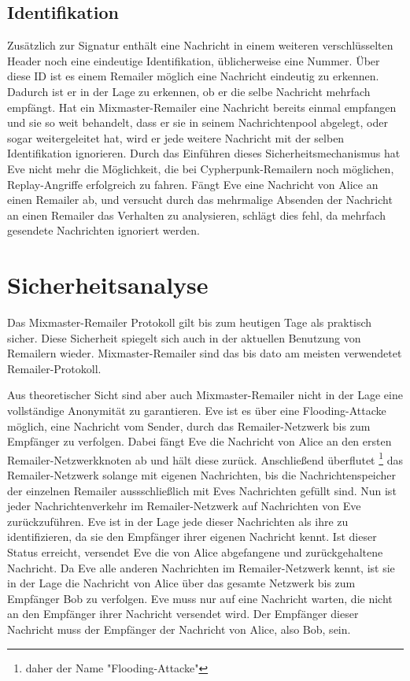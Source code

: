 \subsection{Identifikation}
Zusätzlich zur Signatur enthält eine Nachricht in einem weiteren verschlüsselten Header noch eine eindeutige Identifikation, üblicherweise eine Nummer. Über diese ID ist es einem Remailer möglich eine Nachricht eindeutig zu erkennen. Dadurch ist er in der Lage zu erkennen, ob er die selbe Nachricht mehrfach empfängt. Hat ein Mixmaster-Remailer eine Nachricht bereits einmal empfangen und sie so weit behandelt, dass er sie in seinem Nachrichtenpool abgelegt, oder sogar weitergeleitet hat, wird er jede weitere Nachricht mit der selben Identifikation ignorieren. Durch das Einführen dieses Sicherheitsmechanismus hat Eve nicht mehr die Möglichkeit, die bei Cypherpunk-Remailern noch möglichen, Replay-Angriffe erfolgreich zu fahren. Fängt Eve eine Nachricht von Alice an einen Remailer ab, und versucht durch das mehrmalige Absenden der Nachricht an einen Remailer das Verhalten zu analysieren, schlägt dies fehl, da mehrfach gesendete Nachrichten ignoriert werden.

\section{Sicherheitsanalyse}
Das Mixmaster-Remailer Protokoll gilt bis zum heutigen Tage als praktisch sicher. Diese Sicherheit spiegelt sich auch in der aktuellen Benutzung von Remailern wieder. Mixmaster-Remailer sind das bis dato am meisten verwendetet Remailer-Protokoll.

Aus theoretischer Sicht sind aber auch Mixmaster-Remailer nicht in der Lage eine vollständige Anonymität zu garantieren. Eve ist es über eine Flooding-Attacke möglich, eine Nachricht vom Sender, durch das Remailer-Netzwerk bis zum Empfänger zu verfolgen. Dabei fängt Eve die Nachricht von Alice an den ersten Remailer-Netzwerkknoten ab und hält diese zurück. Anschließend überflutet \footnote{daher der Name "Flooding-Attacke"} das Remailer-Netzwerk solange mit eigenen Nachrichten, bis die Nachrichtenspeicher der einzelnen Remailer aussschließlich mit Eves Nachrichten gefüllt sind. Nun ist jeder Nachrichtenverkehr im Remailer-Netzwerk auf Nachrichten von Eve zurückzuführen. Eve ist in der Lage jede dieser Nachrichten als ihre zu identifizieren, da sie den Empfänger ihrer eigenen Nachricht kennt. Ist dieser Status erreicht, versendet Eve die von Alice abgefangene und zurückgehaltene Nachricht. Da Eve alle anderen Nachrichten im Remailer-Netzwerk kennt, ist sie in der Lage die Nachricht von Alice über das gesamte Netzwerk bis zum Empfänger Bob zu verfolgen. Eve muss nur auf eine Nachricht warten, die nicht an den Empfänger ihrer Nachricht versendet wird. Der Empfänger dieser Nachricht muss der Empfänger der Nachricht von Alice, also Bob, sein.

